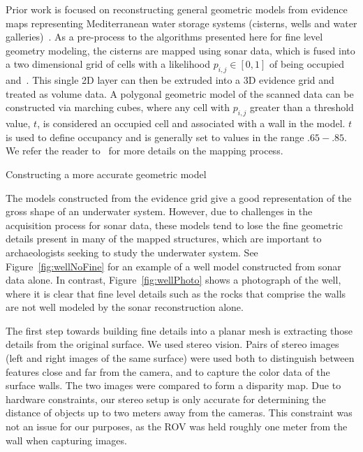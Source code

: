 \documentclass[twocolumn]{article}
\makeatletter
\def\section{\@startsection{section}{1}{\z@}{24pt plus 2 pt
minus 2 pt} {12pt plus 2pt minus 2pt}{\large\bf}}
\makeatother
\begin{document}
Prior work is focused on reconstructing general geometric models from evidence maps representing Mediterranean water storage systems (cisterns, wells and water galleries)~\cite{ICEX11,McVicker,McVicker2}. As a pre-process to the algorithms presented here for fine level geometry modeling, the cisterns are mapped using sonar data, which is fused into a two dimensional grid of cells with a likelihood $p_{i,j} \in [0,1]$ of being occupied \cite{Thrun2005} and~\cite{White10}. This single 2D layer can then be extruded into a 3D evidence grid and treated as volume data. A polygonal geometric model of the scanned data can be constructed via marching cubes, where any cell with $p_{i,j}$ greater than a threshold value, $t$, is considered an occupied cell and associated with a wall in the model. $t$ is used to define occupancy and is generally set to values in the range $.65-.85$. We refer the reader to~\cite{ICEX11,McVicker,McVicker2} for more details on the mapping process.

\section{Constructing a more accurate geometric model}
\label{sec:detail}

\noindent The models constructed from the evidence grid give a good representation of the gross shape of an underwater system. However, due to challenges in the acquisition process for sonar data, these models tend to lose the fine geometric details present in many of the mapped structures, which are important to archaeologists seeking to study the underwater system. See Figure~\ref{fig:wellNoFine} for an example of a well model constructed from sonar data alone. In contrast, Figure~\ref{fig:wellPhoto} shows a photograph of the well, where it is clear that fine level details such as the rocks that comprise the walls are not well modeled by the sonar reconstruction alone.

The first step towards building fine details into a planar mesh is extracting those details from the original surface. 
We used stereo vision. 
Pairs of stereo images (left and right images of the same surface) were used both to distinguish between features close and far from the camera, and to capture the color data of the surface walls.
The two images were compared to form a disparity map. 
Due to hardware constraints, our stereo setup is only accurate for determining the distance of objects up to two meters away from the cameras.
This constraint was not an issue for our purposes, as the ROV was held roughly one meter from the wall when capturing images.
\end{document}
